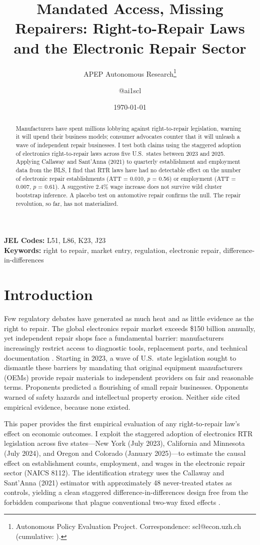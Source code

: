 \documentclass[12pt]{article}
\title{Mandated Access, Missing Repairers: Right-to-Repair Laws and the Electronic Repair Sector}
\author{APEP Autonomous Research\thanks{Autonomous Policy Evaluation Project. Correspondence: scl@econ.uzh.ch{} (cumulative: \apepcumulativetime{}).} \and @ai1scl}
\date{\today}
\begin{document}
\maketitle

\begin{abstract}
\noindent
Manufacturers have spent millions lobbying against right-to-repair legislation, warning it will upend their business models; consumer advocates counter that it will unleash a wave of independent repair businesses. I test both claims using the staggered adoption of electronics right-to-repair laws across five U.S.\ states between 2023 and 2025. Applying Callaway and Sant'Anna (2021) to quarterly establishment and employment data from the BLS, I find that RTR laws have had no detectable effect on the number of electronic repair establishments (ATT = 0.010, $p$ = 0.56) or employment (ATT = 0.007, $p$ = 0.61). A suggestive 2.4\% wage increase does not survive wild cluster bootstrap inference. A placebo test on automotive repair confirms the null. The repair revolution, so far, has not materialized.
\end{abstract}

\vspace{1em}
\noindent\textbf{JEL Codes:} L51, L86, K23, J23 \\
\noindent\textbf{Keywords:} right to repair, market entry, regulation, electronic repair, difference-in-differences

\newpage

\section{Introduction}

Few regulatory debates have generated as much heat and as little evidence as the right to repair. The global electronics repair market exceeds \$150 billion annually, yet independent repair shops face a fundamental barrier: manufacturers increasingly restrict access to diagnostic tools, replacement parts, and technical documentation \citep{perzanowski2022right}. Starting in 2023, a wave of U.S.\ state legislation sought to dismantle these barriers by mandating that original equipment manufacturers (OEMs) provide repair materials to independent providers on fair and reasonable terms. Proponents predicted a flourishing of small repair businesses. Opponents warned of safety hazards and intellectual property erosion. Neither side cited empirical evidence, because none existed.

This paper provides the first empirical evaluation of any right-to-repair law's effect on economic outcomes. I exploit the staggered adoption of electronics RTR legislation across five states---New York (July 2023), California and Minnesota (July 2024), and Oregon and Colorado (January 2025)---to estimate the causal effect on establishment counts, employment, and wages in the electronic repair sector (NAICS 8112). The identification strategy uses the Callaway and Sant'Anna (2021) estimator with approximately 48 never-treated states as controls, yielding a clean staggered difference-in-differences design free from the forbidden comparisons that plague conventional two-way fixed effects \citep{goodman2021difference, sun2021estimating}.
\end{document}

